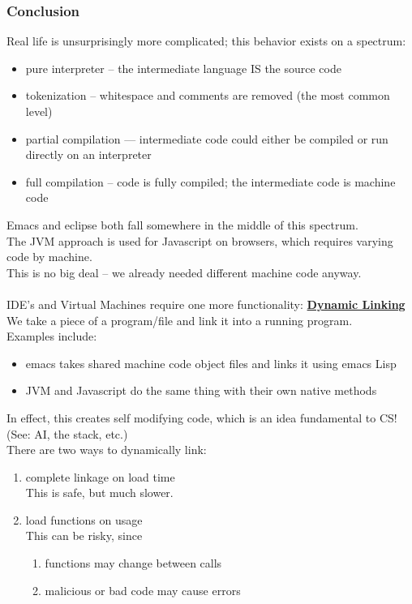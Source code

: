 \documentclass[../../lecture_notes.tex]{subfiles}
\begin{document}
\subsubsection*{Conclusion}
Real life is unsurprisingly more complicated; this behavior exists on a spectrum: 
	\begin{itemize} [itemsep=0mm]
		\item pure interpreter -- the intermediate language IS the source code
		\item tokenization -- whitespace and comments are removed (the most common level)
		\item partial compilation --- intermediate code could either be compiled or run directly on an interpreter
		\item full compilation -- code is fully compiled; the intermediate code is machine code
		\end{itemize}
Emacs and eclipse both fall somewhere in the middle of this spectrum.\\
The JVM approach is used for Javascript on browsers, which requires varying code by machine.\\
	\indent This is no big deal -- we already needed different machine code anyway.\\
\\
IDE's and Virtual Machines require one more functionality: \textbf{\underline{Dynamic Linking}}\\
\indent We take a piece of a program/file and link it into a running program. \\
Examples include: \begin{itemize} [itemsep=0mm]
		\item emacs takes shared machine code object files and links it using emacs Lisp
		\item JVM and Javascript do the same thing with their own native methods
	\end{itemize}
In effect, this creates self modifying code, which is an idea fundamental to CS! (See: AI, the stack, etc.)\\
There are two ways to dynamically link:
	\begin{enumerate} [itemsep=0mm]
		\item complete linkage on load time\\
			This is safe, but much slower.
		\item load functions on usage\\
			This can be risky, since \begin{enumerate} [itemsep=0mm]
					\item functions may change between calls
					\item malicious or bad code may cause errors
				\end{enumerate}
		\end{enumerate}
\end{document}
